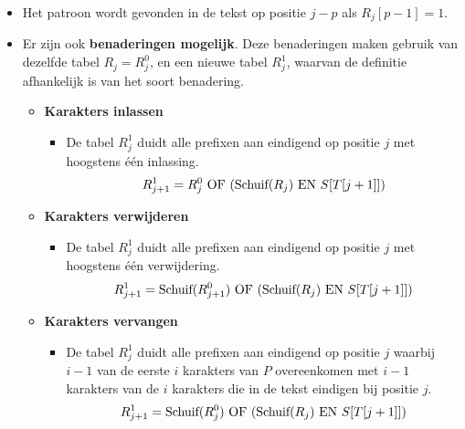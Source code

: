 \begin{itemize}
    \item Het patroon wordt gevonden in de tekst op positie $j - p$ als $R_j[p - 1] = 1$.

    \item Er zijn ook \textbf{benaderingen mogelijk}. Deze benaderingen maken gebruik van dezelfde tabel $R_j = R^0_j$, en een nieuwe tabel $R^1_j$, waarvan de definitie afhankelijk is van het soort benadering. 
    \begin{itemize}
        \item \textbf{Karakters inlassen} 
        \begin{itemize}
            \item De tabel $R^1_j$ duidt alle prefixen aan eindigend op positie $j$ met hoogstens één inlassing.
            $$R^1_{j + 1} = R^0_j \hbox{ OF }(\hbox{Schuif}(R_j) \hbox{ EN } S[T[j + 1]]) $$
        \end{itemize}
        \item \textbf{Karakters verwijderen} 
        \begin{itemize}
            \item De tabel $R^1_j$ duidt alle prefixen aan eindigend op positie $j$  met hoogstens één verwijdering.
            $$R^1_{j + 1} = \hbox{Schuif}(R^0_{j+1}) \hbox{ OF }(\hbox{Schuif}(R_j) \hbox{ EN } S[T[j + 1]]) $$
        \end{itemize}
        \item \textbf{Karakters vervangen}
        \begin{itemize}
            \item De tabel $R^1_j$ duidt alle prefixen aan eindigend op positie $j$ waarbij $i - 1$ van de eerste $i$ karakters van $P$ overeenkomen met $i - 1$ karakters van de $i$ karakters die in de tekst eindigen bij positie $j$.
            $$R^1_{j + 1} = \hbox{Schuif}(R^0_{j}) \hbox{ OF }(\hbox{Schuif}(R_j) \hbox{ EN } S[T[j + 1]]) $$
        \end{itemize}
    \end{itemize}
\end{itemize}

